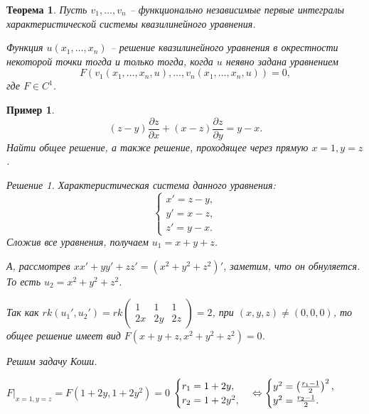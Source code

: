 \documentclass[a5paper, 10pt]{article}
\theoremstyle{definition}
\theoremstyle{plain}
\newtheorem{Th}{Теорема}
\newtheorem{Ex}{Пример}
\theoremstyle{remark}
\newtheorem*{Solution}{Решение}
\begin{document}
    \begin{Th}
        Пусть $v_1, \dots, v_n$ -- функционально независимые первые интегралы характеристической системы квазилинейного уравнения.

        Функция  $u(x_1, \dots, x_n)$ -- решение квазилинейного уравнения в окрестности некоторой точки тогда и только тогда, когда $u$ неявно задана уравнением \[
        F(v_1(x_1, \dots, x_n, u), \dots, v_n(x_1, \dots, x_n, u)) = 0,
        \]
        где $F\in C^1$.
    \end{Th}

    \begin{Ex}
        \[
            (z-y) \frac{\partial z}{\partial x} + (x-z) \frac{\partial z}{\partial y} = y-x. 
        \]
        Найти общее решение, а также решение, проходящее через прямую $x=1, y=z$.
        \begin{Solution}
           Характеристическая система данного уравнения:
           \[
           \begin{cases}
               x' = z-y,\\
               y' = x-z,\\
               z' = y-x.
           \end{cases}
           \] 
           Сложив все уравнения, получаем $u_1 = x+y+z$.
           
           А, рассмотрев $xx'+yy'+zz' = (x^2+y^2+z^2)'$, заметим, что он обнуляется. То есть $u_2 = x^2+y^2+z^2$.

           Так как $rk(u_1', u_2') = rk\begin{pmatrix} 1 & 1 & 1\\ 2x & 2y & 2z\end{pmatrix} =2$, при $(x,y,z)\neq (0,0,0)$, то общее решение имеет вид  $F(x+y+z, x^2+y^2+z^2) = 0$.

           Решим задачу Коши.

           $\left. F\right|_{x=1, y=z} = F(1+2y, 1+2y^2) = 0$
                $\begin{cases}
                    r_1 = 1+2y,\\
                    r_2 = 1+2y^2,
                \end{cases} \Leftrightarrow \begin{cases}
                y^2= \left(\frac{r_1-1}{2}\right)^2,\\
                y^2 = \frac{r_2-1}{2}.
                \end{cases}$
        \end{Solution}  
    \end{Ex}
\end{document}
